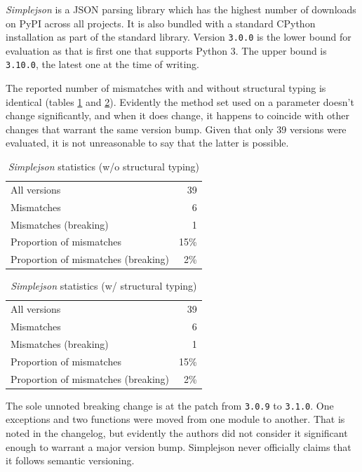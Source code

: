 \documentclass{l4proj}
\newcommand\genericstyle{\lstset{basicstyle=\ttm}}
\newcommand\codeinline[1]{{\genericstyle\lstinline!#1!}}
\begin{document}
\textit{Simplejson} \cite{Simplejson} is a JSON parsing library which
has the highest number of downloads on PyPI across all projects. It is
also bundled with a standard CPython installation as part of the
standard library. Version \codeinline{3.0.0} is the lower bound for
evaluation as that is first one that supports Python 3. The upper
bound is \codeinline{3.10.0}, the latest one at the time of writing.

The reported number of mismatches with and without structural typing
is identical (tables \ref{SimplejsonNonStructural} and
\ref{SimplejsonStructural}). Evidently the method set used on a
parameter doesn't change significantly, and when it does change, it
happens to coincide with other changes that warrant the same version
bump. Given that only 39 versions were evaluated, it is not
unreasonable to say that the latter is possible.

\noindent
\begin{minipage}[t]{0.5\textwidth}
\begin{table}[H]
\centering
\begin{tabular}{|lr|}
All versions & 39 \\
Mismatches & 6 \\
Mismatches (breaking) & 1 \\
Proportion of mismatches & 15\% \\
Proportion of mismatches (breaking) & 2\%
\end{tabular}
\caption{\textit{Simplejson} statistics (w/o structural typing)}
\label{SimplejsonNonStructural}
\end{table}
\end{minipage}
\begin{minipage}[t]{0.5\textwidth}
\begin{table}[H]
\centering
\begin{tabular}{|lr|}
All versions & 39 \\
Mismatches & 6 \\
Mismatches (breaking) & 1 \\
Proportion of mismatches & 15\% \\
Proportion of mismatches (breaking) & 2\%
\end{tabular}
\caption{\textit{Simplejson} statistics (w/ structural typing)}
\label{SimplejsonStructural}
\end{table}
\end{minipage}

The sole unnoted breaking change is at the patch from
\codeinline{3.0.9} to \codeinline{3.1.0}. One exceptions and two
functions were moved from one module to another. That is noted in the
changelog, but evidently the authors did not consider it significant
enough to warrant a major version bump. Simplejson never officially
claims that it follows semantic versioning.
\end{document}
